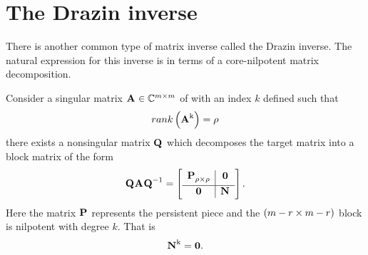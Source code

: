\section{The Drazin inverse}
There is another common type of matrix inverse called the Drazin inverse. The natural expression for this inverse is in terms of a core-nilpotent matrix decomposition.

Consider a singular matrix $\Ac{m}$ of with an index $k$ defined such that
\begin{equation}
  rank\paren{\A{k}} = \rho
\end{equation}
there exists a nonsingular matrix $\Q{}$ which decomposes the target matrix into a block matrix of the form
\begin{equation}
  \Q{}\A{}\Q{-1} = \mat{c|c}{\pee{}_{\rho\times\rho} & \zero \\[3pt]\hline \zero & \N{}}.
\end{equation}
Here the matrix $\pee{}$ represents the persistent piece and the $\paren{\bys{m-r}}$ block is nilpotent with degree $k$. That is
\begin{equation}
  \N{k} = \zero.
\end{equation}


\endinput